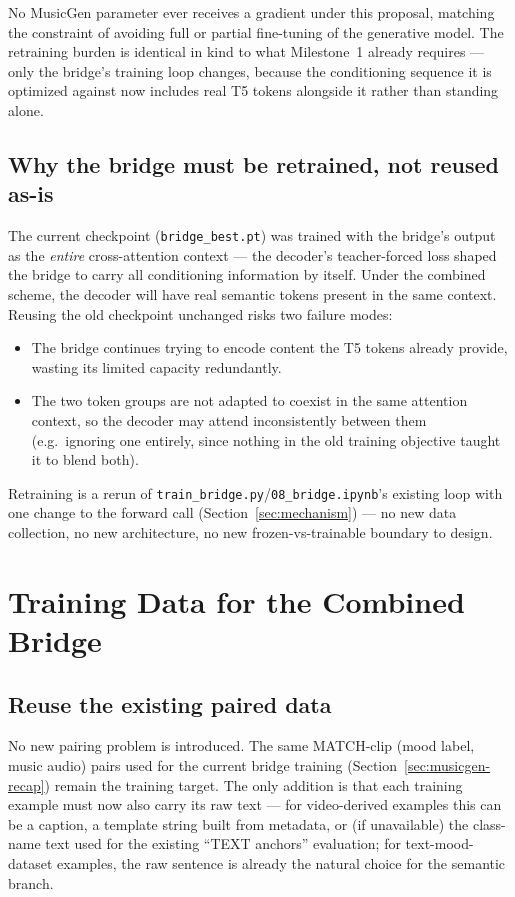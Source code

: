 \documentclass[11pt]{article}
\begin{document}
No MusicGen parameter ever receives a gradient under this proposal, matching the constraint of
avoiding full or partial fine-tuning of the generative model. The retraining burden is identical
in kind to what Milestone~1 already requires --- only the bridge's training loop changes, because
the conditioning sequence it is optimized against now includes real T5 tokens alongside it rather
than standing alone.

\subsection{Why the bridge must be retrained, not reused as-is}
The current checkpoint (\texttt{bridge\_best.pt}) was trained with the bridge's output as the
\emph{entire} cross-attention context --- the decoder's teacher-forced loss shaped the bridge to
carry all conditioning information by itself. Under the combined scheme, the decoder will have
real semantic tokens present in the same context. Reusing the old checkpoint unchanged risks two
failure modes:
\begin{itemize}
\item The bridge continues trying to encode content the T5 tokens already provide, wasting its
limited capacity redundantly.
\item The two token groups are not adapted to coexist in the same attention context, so the
decoder may attend inconsistently between them (e.g.\ ignoring one entirely, since nothing in the
old training objective taught it to blend both).
\end{itemize}
Retraining is a rerun of \texttt{train\_bridge.py}/\texttt{08\_bridge.ipynb}'s existing loop with
one change to the forward call (Section~\ref{sec:mechanism}) --- no new data collection, no new
architecture, no new frozen-vs-trainable boundary to design.

\section{Training Data for the Combined Bridge}

\subsection{Reuse the existing paired data}
No new pairing problem is introduced. The same MATCH-clip (mood label, music audio) pairs used for
the current bridge training (Section~\ref{sec:musicgen-recap}) remain the training target. The
only addition is that each training example must now also carry its raw text --- for video-derived
examples this can be a caption, a template string built from metadata, or (if unavailable) the
class-name text used for the existing ``TEXT anchors'' evaluation; for text-mood-dataset examples,
the raw sentence is already the natural choice for the semantic branch.
\end{document}
